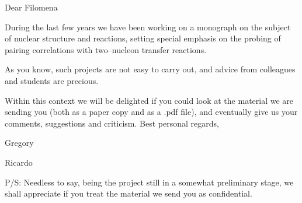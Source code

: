 \documentclass[a4paper,12pt]{book}
\begin{document}
%
Dear Filomena


During the last few years we have been working on a monograph on the subject of nuclear structure and reactions, setting special emphasis on the probing of pairing correlations with two--nucleon transfer reactions.

As you know, such projects are not easy to carry out, and advice from colleagues and students are precious.

Within this context we will be delighted if you could look at the material we are sending you (both as a paper copy and as a .pdf file), and eventually give us your comments, suggestions and criticism.
Best personal regards,
\begin{flushleft}
Gregory
	\end{flushleft}
	\vspace{-1.37cm}
\begin{flushright}
 Ricardo
	\end{flushright}
	P/S: Needless to say, being the project still in a somewhat preliminary stage, we shall appreciate if you treat the material we send you as confidential.
\end{document}
